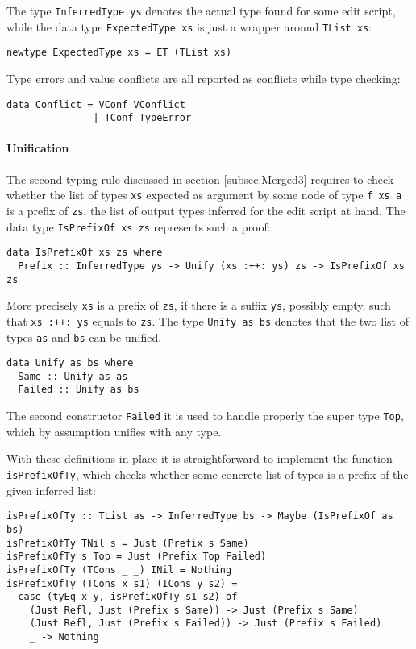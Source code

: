 \documentclass[../Thesis.tex]{subfiles}
\begin{document}
	The type \texttt{InferredType ys} denotes the actual type found for
	some edit script, while the data type \texttt{ExpectedType xs} is just a 
	wrapper around \texttt{TList xs}:
\begin{verbatim}
newtype ExpectedType xs = ET (TList xs)
\end{verbatim}

	Type errors and value conflicts are all reported as conflicts while type 
	checking:
\begin{verbatim}
data Conflict = VConf VConflict
               | TConf TypeError
\end{verbatim}
	
	\paragraph{Unification}
	The second typing rule discussed in section 
	\ref{subsec:Merged3} requires to check whether the list of types \texttt{xs} 
	expected as argument by some node of type \texttt{f xs a} is a prefix of 
	\texttt{zs}, the list of output types inferred for the edit script at hand.
	The data type \texttt{IsPrefixOf xs zs} represents such a proof:

\begin{verbatim}
data IsPrefixOf xs zs where
  Prefix :: InferredType ys -> Unify (xs :++: ys) zs -> IsPrefixOf xs zs
\end{verbatim}

	More precisely \texttt{xs} is a prefix of \texttt{zs}, if there is a suffix 
	\texttt{ys}, possibly empty, such that \texttt{xs :++: ys} equals to 
	\texttt{zs}.
	The type \texttt{Unify as bs}  denotes that the two list of types 
	\texttt{as} and \texttt{bs} can be unified.

\begin{verbatim}
data Unify as bs where
  Same :: Unify as as
  Failed :: Unify as bs
\end{verbatim}

	The second constructor \texttt{Failed} it is used to handle properly the 
	super type \texttt{Top}, which by assumption unifies with any type.
	
	With these definitions in place it is straightforward to implement
	the function \texttt{isPrefixOfTy}, which checks whether some 
	concrete list of types is a prefix of the given inferred list:
	
\begin{verbatim}
isPrefixOfTy :: TList as -> InferredType bs -> Maybe (IsPrefixOf as bs)
isPrefixOfTy TNil s = Just (Prefix s Same)
isPrefixOfTy s Top = Just (Prefix Top Failed)
isPrefixOfTy (TCons _ _) INil = Nothing
isPrefixOfTy (TCons x s1) (ICons y s2) =
  case (tyEq x y, isPrefixOfTy s1 s2) of
    (Just Refl, Just (Prefix s Same)) -> Just (Prefix s Same)
    (Just Refl, Just (Prefix s Failed)) -> Just (Prefix s Failed)
    _ -> Nothing
\end{verbatim}
	
\end{document}
